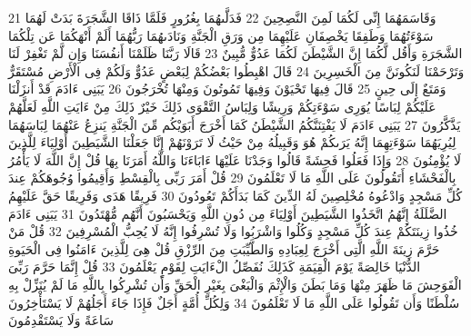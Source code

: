 \documentclass[20pt,a4paper]{article}
\begin{document}
{\tiny\colorbox{cl_aya}{21}} وَقَاسَمَهُمَا إِنِّى لَكُمَا لَمِنَ النَّصِحِينَ
{\tiny\colorbox{cl_aya}{22}} فَدَلَّىهُمَا بِغُرُورٍ فَلَمَّا ذَاقَا الشَّجَرَةَ بَدَتْ لَهُمَا سَوْءَتُهُمَا وَطَفِقَا يَخْصِفَانِ عَلَيْهِمَا مِن وَرَقِ الْجَنَّةِ وَنَادَىهُمَا رَبُّهُمَا أَلَمْ أَنْهَكُمَا عَن تِلْكُمَا الشَّجَرَةِ وَأَقُل لَّكُمَا إِنَّ الشَّيْطَنَ لَكُمَا عَدُوٌّ مُّبِينٌ
{\tiny\colorbox{cl_aya}{23}} قَالَا رَبَّنَا ظَلَمْنَا أَنفُسَنَا وَإِن لَّمْ تَغْفِرْ لَنَا وَتَرْحَمْنَا لَنَكُونَنَّ مِنَ الْخَسِرِينَ
{\tiny\colorbox{cl_aya}{24}} قَالَ اهْبِطُوا بَعْضُكُمْ لِبَعْضٍ عَدُوٌّ وَلَكُمْ فِى الْأَرْضِ مُسْتَقَرٌّ وَمَتَعٌ إِلَى حِينٍ
{\tiny\colorbox{cl_aya}{25}} قَالَ فِيهَا تَحْيَوْنَ وَفِيهَا تَمُوتُونَ وَمِنْهَا تُخْرَجُونَ
{\tiny\colorbox{cl_aya}{26}} يَبَنِى ءَادَمَ قَدْ أَنزَلْنَا عَلَيْكُمْ لِبَاسًا يُوَرِى سَوْءَتِكُمْ وَرِيشًا وَلِبَاسُ التَّقْوَى ذَلِكَ خَيْرٌ ذَلِكَ مِنْ ءَايَتِ اللَّهِ لَعَلَّهُمْ يَذَّكَّرُونَ
{\tiny\colorbox{cl_aya}{27}} يَبَنِى ءَادَمَ لَا يَفْتِنَنَّكُمُ الشَّيْطَنُ كَمَا أَخْرَجَ أَبَوَيْكُم مِّنَ الْجَنَّةِ يَنزِعُ عَنْهُمَا لِبَاسَهُمَا لِيُرِيَهُمَا سَوْءَتِهِمَا إِنَّهُ يَرَىكُمْ هُوَ وَقَبِيلُهُ مِنْ حَيْثُ لَا تَرَوْنَهُمْ إِنَّا جَعَلْنَا الشَّيَطِينَ أَوْلِيَاءَ لِلَّذِينَ لَا يُؤْمِنُونَ
{\tiny\colorbox{cl_aya}{28}} وَإِذَا فَعَلُوا فَحِشَةً قَالُوا وَجَدْنَا عَلَيْهَا ءَابَاءَنَا وَاللَّهُ أَمَرَنَا بِهَا قُلْ إِنَّ اللَّهَ لَا يَأْمُرُ بِالْفَحْشَاءِ أَتَقُولُونَ عَلَى اللَّهِ مَا لَا تَعْلَمُونَ
{\tiny\colorbox{cl_aya}{29}} قُلْ أَمَرَ رَبِّى بِالْقِسْطِ وَأَقِيمُوا وُجُوهَكُمْ عِندَ كُلِّ مَسْجِدٍ وَادْعُوهُ مُخْلِصِينَ لَهُ الدِّينَ كَمَا بَدَأَكُمْ تَعُودُونَ
{\tiny\colorbox{cl_aya}{30}} فَرِيقًا هَدَى وَفَرِيقًا حَقَّ عَلَيْهِمُ الضَّلَلَةُ إِنَّهُمُ اتَّخَذُوا الشَّيَطِينَ أَوْلِيَاءَ مِن دُونِ اللَّهِ وَيَحْسَبُونَ أَنَّهُم مُّهْتَدُونَ
{\tiny\colorbox{cl_aya}{31}} يَبَنِى ءَادَمَ خُذُوا زِينَتَكُمْ عِندَ كُلِّ مَسْجِدٍ وَكُلُوا وَاشْرَبُوا وَلَا تُسْرِفُوا إِنَّهُ لَا يُحِبُّ الْمُسْرِفِينَ
{\tiny\colorbox{cl_aya}{32}} قُلْ مَنْ حَرَّمَ زِينَةَ اللَّهِ الَّتِى أَخْرَجَ لِعِبَادِهِ وَالطَّيِّبَتِ مِنَ الرِّزْقِ قُلْ هِىَ لِلَّذِينَ ءَامَنُوا فِى الْحَيَوةِ الدُّنْيَا خَالِصَةً يَوْمَ الْقِيَمَةِ كَذَلِكَ نُفَصِّلُ الْءَايَتِ لِقَوْمٍ يَعْلَمُونَ
{\tiny\colorbox{cl_aya}{33}} قُلْ إِنَّمَا حَرَّمَ رَبِّىَ الْفَوَحِشَ مَا ظَهَرَ مِنْهَا وَمَا بَطَنَ وَالْإِثْمَ وَالْبَغْىَ بِغَيْرِ الْحَقِّ وَأَن تُشْرِكُوا بِاللَّهِ مَا لَمْ يُنَزِّلْ بِهِ سُلْطَنًا وَأَن تَقُولُوا عَلَى اللَّهِ مَا لَا تَعْلَمُونَ
{\tiny\colorbox{cl_aya}{34}} وَلِكُلِّ أُمَّةٍ أَجَلٌ فَإِذَا جَاءَ أَجَلُهُمْ لَا يَسْتَأْخِرُونَ سَاعَةً وَلَا يَسْتَقْدِمُونَ
\end{document}
